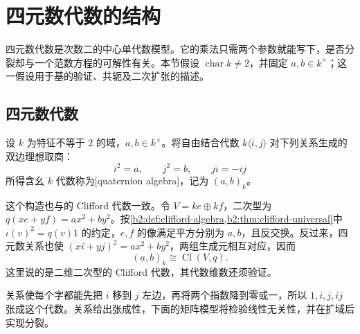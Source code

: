 
\section{四元数代数的结构}
\label{b2:sec:1704}

四元数代数是次数二的中心单代数模型。它的乘法只需两个参数就能写下，是否分裂却与一个范数方程的可解性有关。本节假设 \(\operatorname{char}k\ne2\)，并固定 \(a,b\in k^\times\)；这一假设用于基的验证、共轭及二次扩张的描述。

%
%

\subsection{四元数代数}
\label{b2:subsec:1704:01}

\begin{definition}\label{b2:def:quaternion-algebra}
	设 \(k\) 为特征不等于 \(2\) 的域，\(a,b\in k^\times\)。将自由结合代数 \(k\langle i,j\rangle\) 对下列关系生成的双边理想取商：
	\[
		i^2=a,\qquad j^2=b,\qquad ji=-ij
	\]
	所得含幺 \(k\) 代数称为[quaternion algebra]，记为 \((a,b)_k\)。
\end{definition}

这个构造也与的 Clifford 代数一致。令 \(V=ke\oplus kf\)，二次型为 \(q(xe+yf)=ax^2+by^2\)。按\cref{b2:def:clifford-algebra,b2:thm:clifford-universal}中 \(\iota(v)^2=q(v)1\) 的约定，\(e,f\) 的像满足平方分别为 \(a,b\)，且反交换。反过来，四元数关系也使 \((xi+yj)^2=ax^2+by^2\)，两组生成元相互对应，因而
\[
	(a,b)_k\cong\operatorname{Cl}(V,q).
\]
这里说的是二维二次型的 Clifford 代数，其代数维数还须验证。

\ProseParagraphBreak
关系使每个字都能先把 \(i\) 移到 \(j\) 左边，再将两个指数降到零或一，所以 \(1,i,j,ij\) 张成这个代数。关系给出张成性，下面的矩阵模型将检验线性无关性，并在扩域后实现分裂。

